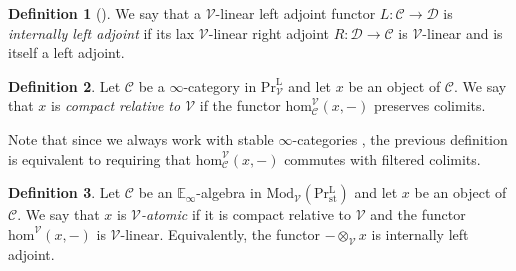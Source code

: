 \documentclass[oneside, hidelinks, 12pt, a4paper,reqno]{amsart}
\theoremstyle{plain}
\theoremstyle{definition}
\newtheorem{definition}[definition]{Definition}
\theoremstyle{plain}
\newcommand{\rL}{\mathrm L}
\newcommand{\cC}{\mathscr C}
\newcommand{\cD}{\mathscr D}
\newcommand{\cV}{\mathscr V}
\newcommand{\bbE}{\mathbb E}
\newcommand{\cat}{$\infty$-category }
\newcommand{\cates}{$\infty$-categories }
\newcommand{\LPr}{\mathrm{Pr}^\rL}
\newcommand{\LPrst}{\mathrm{P}\mathrm{r}^\rL_{\mathrm{st}}}
\newcommand{\Mod}{\mathrm{Mod}}
\begin{document}
\begin{definition}[{\cite[Proposition 5.2]{BenMoshe2024}}]\label{def: internally left adjoint functors}
    We say that a $\cV$-linear left adjoint functor $L\colon \cC \to \cD$ is \emph{internally left adjoint} if its lax $\cV$-linear right adjoint $R\colon \cD \to \cC$ is $\cV$-linear and is itself a left adjoint.
\end{definition}

\begin{definition}\label{def: relatively compact}
    Let $\cC$ be a \cat in $\LPr_{\cV}$ and let $x$ be an object of $\cC$. We say that $x$ is \emph{compact relative to $\cV$} if the functor $\mathrm{hom}_{\cC}^{\cV}(x,-)$ preserves colimits.
\end{definition}

Note that since we always work with stable \cates, the previous definition is equivalent to requiring that $\mathrm{hom}_{\cC}^{\cV}(x,-)$ commutes with filtered colimits.

\begin{definition}\label{def: atomic object}
    Let $\cC$ be an $\bbE_{\infty}$-algebra in $\Mod_{\cV}(\LPrst)$ and let $x$ be an object of $\cC$. We say that $x$ is \emph{$\cV$-atomic} if it is compact relative to $\cV$ and the functor $\mathrm{hom}^{\cV}(x,-)$ is $\cV$-linear. Equivalently, the functor $-\otimes_{\cV} x$ is internally left adjoint.
\end{definition}
\end{document}
